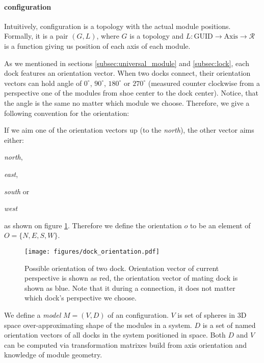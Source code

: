 \paragraph{configuration} Intuitively, configuration is a topology with the
actual module positions. Formally, it is a pair $(G, L)$, where $G$ is a
topology and $L: \text{GUID} \rightarrow \text{Axis} \rightarrow \mathcal{R}$ is
a function giving us position of each axis of each module.

As we mentioned in sections \ref{subsec:universal_module} and \ref{subsec:lock},
each dock features an orientation vector. When two docks connect, their
orientation vectors can hold angle of $0^\circ$, $90^\circ$, $180^\circ$ or
$270^\circ$ (measured counter clockwise from a perspective one of the modules
from shoe center to the dock center). Notice, that the angle is the same no
matter which module we choose. Therefore, we give a following convention for the
orientation:

If we aim one of the orientation vectors up (to the \emph{north}), the other
vector aims either:
\begin{enumerate*}
    \item \emph{north},
    \item \emph{east},
    \item \emph{south} or
    \item \emph{west}
\end{enumerate*}
as shown on figure \ref{fig:dock_orientation}.
Therefore we define the orientation $o$ to be an element of $O = \{N, E, S,
W\}$.

\begin{figure}
    \centering
    \texttt{[image: figures/dock\_orientation.pdf]}
    \caption{Possible orientation of two dock. Orientation vector of current
    perspective is shown as red, the orientation vector of mating dock is shown
    as blue. Note that it during a connection, it does not matter which dock's
    perspective we choose.}
    \label{fig:dock_orientation}
\end{figure}

We define a \emph{model} $M = (V, D)$ of an configuration. $V$ is set of spheres
in 3D space over-approximating shape of the modules in a system. $D$ is a set of
named orientation vectors of all docks in the system positioned in space. Both
$D$ and $V$ can be computed via transformation matrixes build from axis
orientation and knowledge of module geometry.

